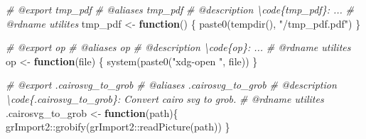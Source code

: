 \documentclass[
]{article}
\newenvironment{Shaded}{\begin{snugshade}}{\end{snugshade}}
\newcommand{\CommentTok}[1]{\textcolor[rgb]{0.56,0.35,0.01}{\textit{#1}}}
\newcommand{\ControlFlowTok}[1]{\textcolor[rgb]{0.13,0.29,0.53}{\textbf{#1}}}
\newcommand{\FunctionTok}[1]{\textcolor[rgb]{0.00,0.00,0.00}{#1}}
\newcommand{\NormalTok}[1]{#1}
\newcommand{\OtherTok}[1]{\textcolor[rgb]{0.56,0.35,0.01}{#1}}
\newcommand{\SpecialCharTok}[1]{\textcolor[rgb]{0.00,0.00,0.00}{#1}}
\newcommand{\StringTok}[1]{\textcolor[rgb]{0.31,0.60,0.02}{#1}}
\begin{document}
\begin{Shaded}
\begin{Highlighting}[]
\CommentTok{\#\textquotesingle{} @export tmp\_pdf}
\CommentTok{\#\textquotesingle{} @aliases tmp\_pdf}
\CommentTok{\#\textquotesingle{} @description \textbackslash{}code\{tmp\_pdf\}: ...}
\CommentTok{\#\textquotesingle{} @rdname utilites}
\NormalTok{tmp\_pdf }\OtherTok{\textless{}{-}} \ControlFlowTok{function}\NormalTok{() \{}
  \FunctionTok{paste0}\NormalTok{(}\FunctionTok{tempdir}\NormalTok{(), }\StringTok{"/tmp\_pdf.pdf"}\NormalTok{)}
\NormalTok{\}}

\CommentTok{\#\textquotesingle{} @export op}
\CommentTok{\#\textquotesingle{} @aliases op}
\CommentTok{\#\textquotesingle{} @description \textbackslash{}code\{op\}: ...}
\CommentTok{\#\textquotesingle{} @rdname utilites}
\NormalTok{op }\OtherTok{\textless{}{-}} \ControlFlowTok{function}\NormalTok{(file) \{}
  \FunctionTok{system}\NormalTok{(}\FunctionTok{paste0}\NormalTok{(}\StringTok{"xdg{-}open "}\NormalTok{, file))}
\NormalTok{\}}

\CommentTok{\#\textquotesingle{} @export .cairosvg\_to\_grob}
\CommentTok{\#\textquotesingle{} @aliases .cairosvg\_to\_grob}
\CommentTok{\#\textquotesingle{} @description \textbackslash{}code\{.cairosvg\_to\_grob\}: Convert cairo svg to \textquotesingle{}grob\textquotesingle{}.}
\CommentTok{\#\textquotesingle{} @rdname utilites}
\NormalTok{.cairosvg\_to\_grob }\OtherTok{\textless{}{-}} 
  \ControlFlowTok{function}\NormalTok{(path)\{}
\NormalTok{    grImport2}\SpecialCharTok{::}\FunctionTok{grobify}\NormalTok{(grImport2}\SpecialCharTok{::}\FunctionTok{readPicture}\NormalTok{(path))}
\NormalTok{  \}}


\end{Highlighting}
\end{Shaded}
\end{document}
